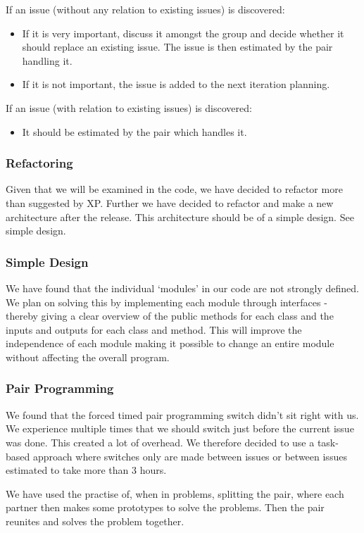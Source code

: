 If an issue (without any relation to existing issues) is discovered:
\begin{itemize}
\item If it is very important, discuss it amongst the group and decide whether it should replace an existing issue. The issue is then estimated by the pair handling it.
\item If it is not important, the issue is added to the next iteration planning.
\end{itemize}
If an issue (with relation to existing issues) is discovered:
\begin{itemize}
\item It should be estimated by the pair which handles it.
\end{itemize}

\subsubsection{Refactoring}
Given that we will be examined in the code, we have decided to refactor more than suggested by XP.
Further we have decided to refactor and make a new architecture after the release. This architecture should be of a simple design. See simple design.

\subsubsection{Simple Design}
We have found that the individual ‘modules’ in our code are not strongly defined. We plan on solving this by implementing each module through interfaces - thereby giving a clear overview of the public methods for each class and the inputs and outputs for each class and method. This will improve the independence of each module making it possible to change an entire module without affecting the overall program.

\subsubsection{Pair Programming}
We found that the forced timed pair programming switch didn’t sit right with us. We experience multiple times that we should switch just before the current issue was done. This created a lot of overhead.
We therefore decided to use a task-based approach where switches only are made between issues or between issues estimated to take more than 3 hours.

We have used the practise of, when in problems, splitting the pair, where each partner then makes some prototypes to solve the problems. Then the pair reunites and solves the problem together.

